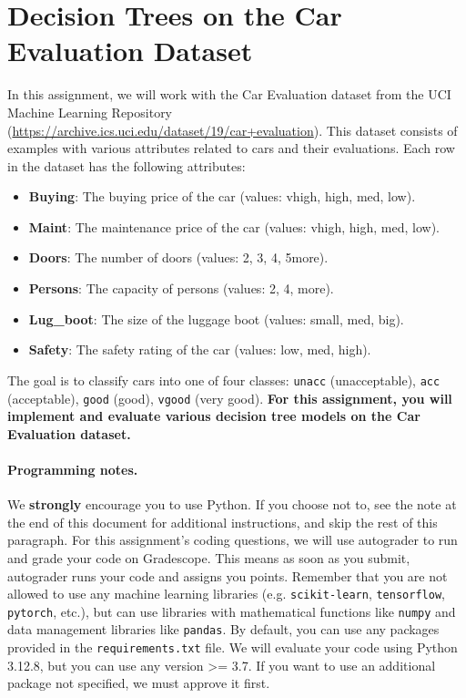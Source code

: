
\section{Decision Trees on the Car Evaluation Dataset}
\label{sec:decision-tree-code}

\noindent In this assignment, we will work with the Car Evaluation dataset from the UCI Machine Learning Repository (\url{https://archive.ics.uci.edu/dataset/19/car+evaluation}). 
This dataset consists of examples with various attributes related to cars and their evaluations. Each row in the dataset has the following attributes:

\begin{itemize}\itemsep0em
    \item \textbf{Buying}: The buying price of the car (values: vhigh, high, med, low).
    \item \textbf{Maint}: The maintenance price of the car (values: vhigh, high, med, low).
    \item \textbf{Doors}: The number of doors (values: 2, 3, 4, 5more).
    \item \textbf{Persons}: The capacity of persons (values: 2, 4, more).
    \item \textbf{Lug\_boot}: The size of the luggage boot (values: small, med, big).
    \item \textbf{Safety}: The safety rating of the car (values: low, med, high).
\end{itemize}

\noindent The goal is to classify cars into one of four classes: \texttt{unacc} (unacceptable), \texttt{acc} (acceptable), \texttt{good} (good), \texttt{vgood} (very good).
\textbf{For this assignment, you will implement and evaluate various decision tree models on the Car Evaluation dataset.}

\paragraph{Programming notes.} We \textbf{strongly} encourage you to use Python. 
If you choose not to, see the note at the end of this document for additional instructions, and skip the rest of this paragraph.
For this assignment's coding questions, we will use autograder to run and grade your code on Gradescope. 
This means as soon as you submit, autograder runs your code and assigns you points. 
Remember that you are not allowed to use any machine learning libraries (e.g. \texttt{scikit-learn}, \texttt{tensorflow}, \texttt{pytorch}, etc.), 
but can use libraries with mathematical functions like \texttt{numpy} and data management libraries like \texttt{pandas}.
By default, you can use any packages provided in the \texttt{requirements.txt} file.
We will evaluate your code using Python 3.12.8, but you can use any version >= 3.7.
If you want to use an additional package not specified, we must approve it first.

